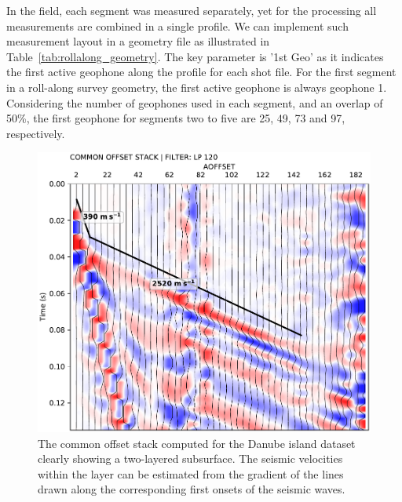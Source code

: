 \documentclass[a4paper,fleqn]{cas-sc}
\begin{document}
In the field, each segment was measured separately, yet for the processing all measurements are combined in a single profile. %
We can implement such measurement layout in a geometry file 
as illustrated in Table~\ref{tab:rollalong_geometry}. %
The key parameter is '1st Geo' as it indicates the first active geophone along the profile for each shot file. For the first segment in a roll-along survey geometry, the first active geophone is always geophone 1. Considering the number of geophones used in each segment, and an overlap of 50\%, the first geophone for segments two to five are 25, 49, 73 and 97, respectively.

\begin{figure}
	\centering
	\includegraphics[width=.75\textwidth]{figures/danube_island_cos_lp120.pdf}
	\caption{The common offset stack computed for the Danube island dataset clearly showing a two-layered subsurface. The seismic velocities within the layer can be estimated from the gradient of the lines drawn along the corresponding first onsets of the seismic waves.}
	\label{fig:fieldcos}
\end{figure}
\end{document}
